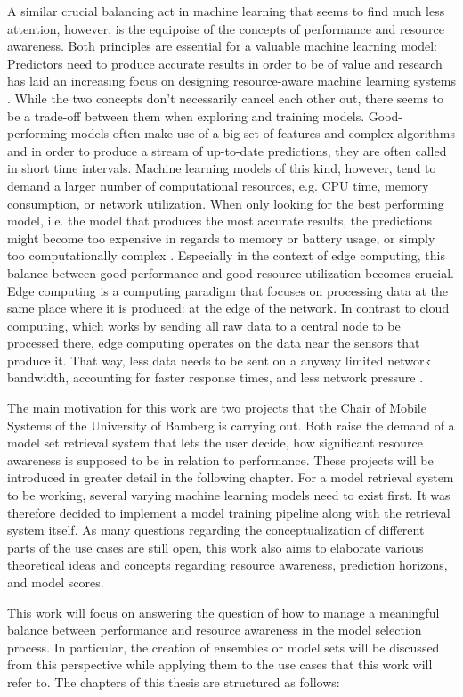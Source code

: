 A similar crucial balancing act in machine learning that seems to find much less attention, however, is the equipoise of the concepts of performance and resource awareness. Both principles are essential for a valuable machine learning model: Predictors need to produce accurate results in order to be of value and research has laid an increasing focus on designing resource-aware machine learning systems \cite{rapp2022}. While the two concepts don’t necessarily cancel each other out, there seems to be a trade-off between them when exploring and training models. Good-performing models often make use of a big set of features and complex algorithms and in order to produce a stream of up-to-date predictions, they are often called in short time intervals. Machine learning models of this kind, however, tend to demand a larger number of computational resources, e.g. CPU time, memory consumption, or network utilization. When only looking for the best performing model, i.e. the model that produces the most accurate results, the predictions might become too expensive in regards to memory or battery usage, or simply too computationally complex \cite{preuveneers2020}. Especially in the context of edge computing, this balance between good performance and good resource utilization becomes crucial. Edge computing is a computing paradigm that focuses on processing data at the same place where it is produced: at the edge of the network. In contrast to cloud computing, which works by sending all raw data to a central node to be processed there, edge computing operates on the data near the sensors that produce it. That way, less data needs to be sent on a anyway limited network bandwidth, accounting for faster response times, and less network pressure \cite{shi2016}.

The main motivation for this work are two projects that the Chair of Mobile Systems of the University of Bamberg is carrying out. Both raise the demand of a model set retrieval system that lets the user decide, how significant resource awareness is supposed to be in relation to performance. These projects will be introduced in greater detail in the following chapter. For a model retrieval system to be working, several varying machine learning models need to exist first. It was therefore decided to implement a model training pipeline along with the retrieval system itself. As many questions regarding the conceptualization of different parts of the use cases are still open, this work also aims to elaborate various theoretical ideas and concepts regarding resource awareness, prediction horizons, and model scores.

This work will focus on answering the question of how to manage a meaningful balance between performance and resource awareness in the model selection process. In particular, the creation of ensembles or model sets will be discussed from this perspective while applying them to the use cases that this work will refer to. The chapters of this thesis are structured as follows: 
